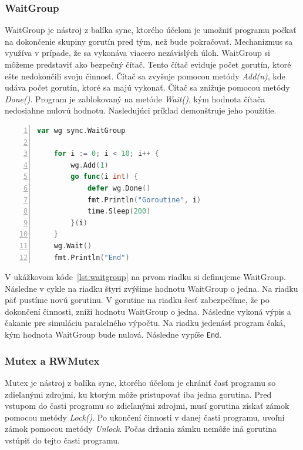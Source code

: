 \documentclass[
  biblatex,
  seconds=true,
  language=slovak,
  figures=false,
  urldate=iso,
  glossaries,
  index
]{kidiplom}
\begin{document}
\subsubsection{WaitGroup}
WaitGroup je nástroj z balíka sync, ktorého účelom je umožniť programu počkať na dokončenie skupiny gorutín pred tým, než bude pokračovať.
Mechanizmus sa využíva v prípade, že sa vykonáva viacero nezávislých úloh.
WaitGroup si môžeme predstaviť ako bezpečný čítač. Tento čítač eviduje počet gorutín, ktoré ešte nedokončili svoju činnosť.
Čítač sa zvyšuje pomocou metódy \emph{Add(n)}, kde  udáva počet gorutín, ktoré sa majú vykonať.
Čítač sa znižuje pomocou metódy \emph{Done()}.
Program je zablokovaný na metóde \emph{Wait()}, kým hodnota čítača nedosiahne nulovú hodnotu. Nasledujúci príklad demonštruje jeho použitie.
\newpage
\begin{lstlisting}[language=Go, numbers=left, caption={Použitie WaitGroup}, captionpos=b, label={lst:waitgroup}]
    var wg sync.WaitGroup

	for i := 0; i < 10; i++ {
		wg.Add(1)
		go func(i int) {
			defer wg.Done()
			fmt.Println("Goroutine", i)
			time.Sleep(200)
		}(i)
	}
	wg.Wait()
	fmt.Println("End")
\end{lstlisting}
V ukážkovom kóde~\ref{lst:waitgroup} na prvom riadku si definujeme WaitGroup. Následne v cykle na riadku štyri zvýšime hodnotu WaitGroup o jedna. Na riadku päť pustíme novú gorutinu.
V gorutine na riadku šesť zabezpečíme, že po dokončení činnosti, zníži hodnotu WaitGroup o jedna.
Následne vykoná výpis a čakanie pre simuláciu paralelného výpočtu.
Na riadku jedenásť program čaká, kým hodnota WaitGroup bude nulová. Následne vypíše \texttt{End}.

\subsubsection{Mutex a RWMutex}
Mutex je nástroj z balíka sync, ktorého účelom je chrániť časť programu so zdieľanými zdrojmi, ku ktorým môže pristupovať iba jedna gorutina.
Pred vstupom do časti programu so zdieľanými zdrojmi, musí gorutina získať zámok pomocou metódy \emph{Lock()}. Po ukončení činnosti
v danej časti programu, uvoľní zámok pomocou metódy \emph{Unlock}. Počas držania zámku nemôže iná gorutina vstúpiť do tejto časti programu.
\end{document}

